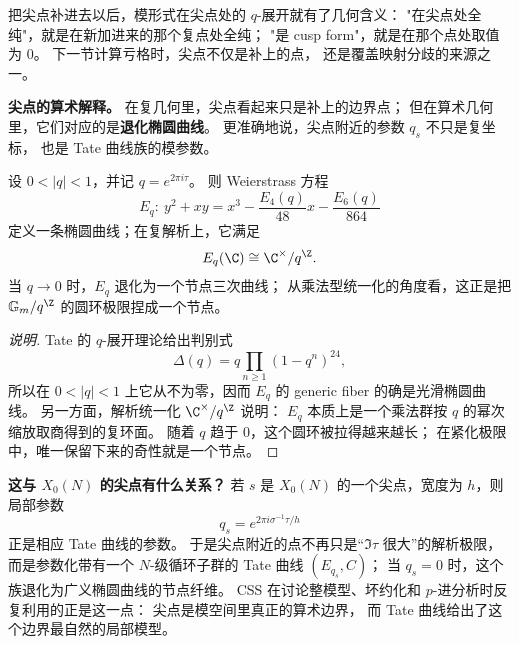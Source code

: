 \begin{remark}
把尖点补进去以后，模形式在尖点处的 $q$-展开就有了几何含义：
"在尖点处全纯"，就是在新加进来的那个复点处全纯；
"是 cusp form"，就是在那个点处取值为 $0$。
下一节计算亏格时，尖点不仅是补上的点，
还是覆盖映射分歧的来源之一。
\end{remark}

\textbf{尖点的算术解释。}
在复几何里，尖点看起来只是补上的边界点；
但在算术几何里，它们对应的是\textbf{退化椭圆曲线}。
更准确地说，尖点附近的参数 $q_s$ 不只是复坐标，
也是 Tate 曲线族的模参数。

\begin{proposition}
\label{prop:tate-curve-cusp-model}
设 $0<|q|<1$，并记 $q=e^{2\pi i\tau}$。
则 Weierstrass 方程
\[
  E_q:\ y^2+xy=x^3-\frac{E_4(q)}{48}x-\frac{E_6(q)}{864}
\]
定义一条椭圆曲线；在复解析上，它满足
\[
  E_q(\C)\cong \C^\times/q^\Z.
\]
当 $q\to 0$ 时，$E_q$ 退化为一个节点三次曲线；
从乘法型统一化的角度看，这正是把 $\mathbb{G}_m/q^\Z$ 的圆环极限捏成一个节点。
\end{proposition}

\begin{proof}[说明]
Tate 的 $q$-展开理论给出判别式
\[
  \Delta(q)=q\prod_{n\ge 1}(1-q^n)^{24},
\]
所以在 $0<|q|<1$ 上它从不为零，因而 $E_q$ 的 generic fiber 的确是光滑椭圆曲线。
另一方面，解析统一化 $\C^\times/q^\Z$ 说明：
$E_q$ 本质上是一个乘法群按 $q$ 的幂次缩放取商得到的复环面。
随着 $q$ 趋于 $0$，这个圆环被拉得越来越长；
在紧化极限中，唯一保留下来的奇性就是一个节点。
\end{proof}



\textbf{这与 $X_0(N)$ 的尖点有什么关系？}
若 $s$ 是 $X_0(N)$ 的一个尖点，宽度为 $h$，则局部参数
\[
  q_s=e^{2\pi i\sigma^{-1}\tau/h}
\]
正是相应 Tate 曲线的参数。
于是尖点附近的点不再只是“$\Im\tau$ 很大”的解析极限，
而是参数化带有一个 $N$-级循环子群的 Tate 曲线 $(E_{q_s},C)$；
当 $q_s=0$ 时，这个族退化为广义椭圆曲线的节点纤维。
CSS 在讨论整模型、坏约化和 $p$-进分析时反复利用的正是这一点：
尖点是模空间里真正的算术边界，
而 Tate 曲线给出了这个边界最自然的局部模型。
